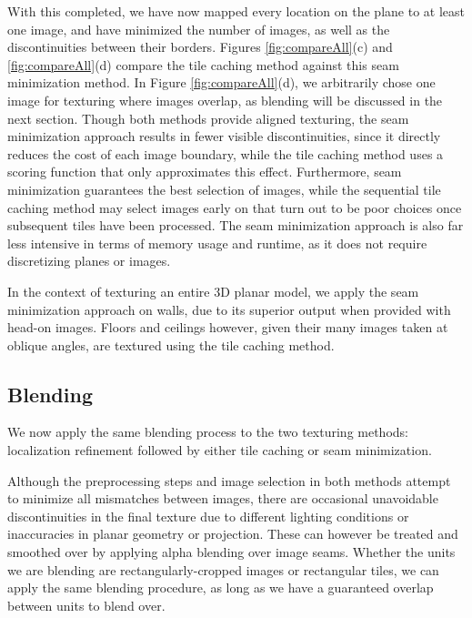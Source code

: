 \documentclass[10pt,twocolumn,letterpaper]{article}
\begin{document}
With this completed, we have now mapped every location on the plane to
at least one image, and have minimized the number of images, as well
as the discontinuities between their borders. Figures
\ref{fig:compareAll}(c) and \ref{fig:compareAll}(d) compare the tile
caching method against this seam minimization method. In Figure
\ref{fig:compareAll}(d), we arbitrarily chose one image for texturing
where images overlap, as blending will be discussed in the next
section. Though both methods provide aligned texturing, the seam
minimization approach results in fewer visible discontinuities, since
it directly reduces the cost of each image boundary, while the tile
caching method uses a scoring function that only approximates this
effect. Furthermore, seam minimization guarantees the best selection
of images, while the sequential tile caching method may select images
early on that turn out to be poor choices once subsequent tiles have
been processed. The seam minimization approach is also far less intensive
in terms of memory usage and runtime, as it does not require
discretizing planes or images.

In the context of texturing an entire 3D planar model, we apply the
seam minimization approach on walls, due to its superior output when
provided with head-on images. Floors and ceilings however, given their
many images taken at oblique angles, are textured using the tile
caching method.



\subsection{Blending}
\label{sec:blending}
We now apply the same blending process to the two texturing methods:
localization refinement followed by either tile caching or seam
minimization.

Although the preprocessing steps and image selection in both methods
attempt to minimize all mismatches between images, there are
occasional unavoidable discontinuities in the final texture due to
different lighting conditions or inaccuracies in planar geometry or
projection. These can however be treated and smoothed over by applying
alpha blending over image seams.  Whether the units we are blending
are rectangularly-cropped images or rectangular tiles, we can apply
the same blending procedure, as long as we have a guaranteed overlap
between units to blend over.
\end{document}
